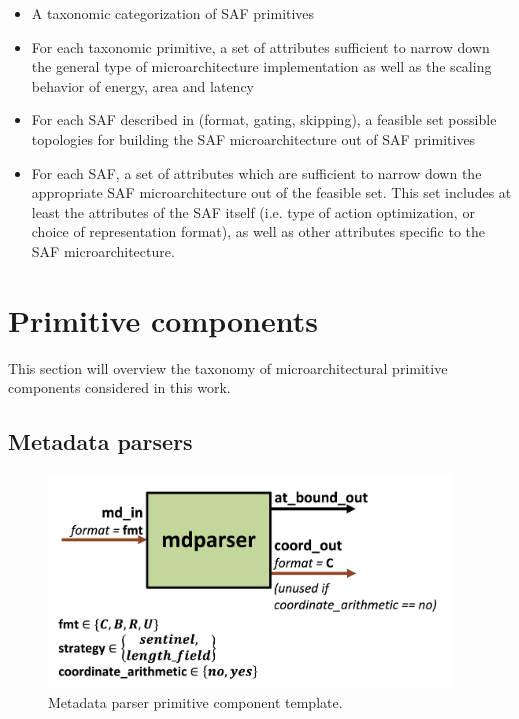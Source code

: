%
\begin{itemize}
    \item A taxonomic categorization of SAF primitives
    \item For each taxonomic primitive, a set of attributes sufficient to narrow down the general type of microarchitecture implementation as well as the scaling behavior of energy, area and latency
    \item For each SAF described in \cite{sparseloop} (format, gating, skipping), a feasible set possible topologies for building the SAF microarchitecture out of SAF primitives
    \item For each SAF, a set of attributes which are sufficient to narrow down the appropriate SAF microarchitecture out of the feasible set. This set includes at least the attributes of the SAF itself (i.e. type of action optimization, or choice of representation format), as well as other attributes specific to the SAF microarchitecture.
\end{itemize}

\section{Primitive components}

This section will overview the taxonomy of microarchitectural primitive components considered in this work.

\subsection{Metadata parsers}

\begin{figure}[H]
    \centering
    \includegraphics[width=0.95\textwidth]{figures/mdparser.png}
    \caption{Metadata parser primitive component template.}
    \label{fig:mdparser}
\end{figure}

